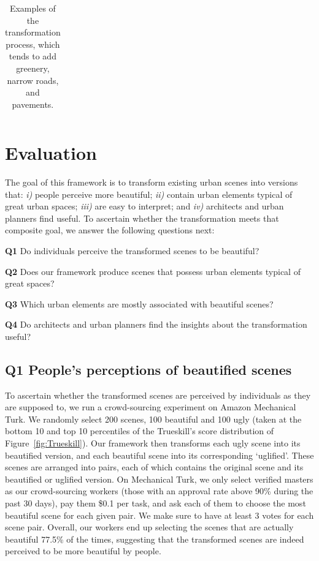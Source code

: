 \begin{table}
\begin{tabular}{l*3{C}@{}}
        \bottomrule 
    \end{tabular}
    \caption{Examples of the transformation process, which tends to add greenery, narrow roads, and  pavements.}
    \label{fig:BeautyExample}
\end{table} 




\section{Evaluation}
\label{sec:evaluation}

The goal of this framework is to transform existing urban scenes into versions that: \emph{i)} people perceive more beautiful; \emph{ii)} contain urban elements typical of great urban spaces; \emph{iii)} are easy to interpret; and \emph{iv)} architects and urban planners find useful. To ascertain whether the transformation meets that composite goal, we answer the following questions next: 

\begin{description}
    \item{\textbf{Q1}} Do individuals perceive the transformed scenes to be beautiful?
    \item{\textbf{Q2}}  Does our framework produce scenes that possess urban elements typical of great spaces?  
    \item{\textbf{Q3}}  Which urban elements are mostly associated with beautiful scenes?    
    \item{\textbf{Q4}}  Do architects and urban planners find the insights about the transformation useful?    
\end{description}


\subsection{Q1 People's perceptions of beautified scenes}
To ascertain whether the transformed scenes are perceived by individuals as they are supposed to, we run a crowd-sourcing experiment on Amazon Mechanical Turk.  We randomly select 200 scenes, 100 beautiful and 100 ugly  (taken at the bottom 10 and top 10 percentiles of the Trueskill's score distribution of Figure~\ref{fig:Trueskill}). Our framework then transforms each ugly scene into its beautified version, and each beautiful scene into its corresponding `uglified'. These scenes are arranged into pairs, each of which contains the original scene and its beautified or uglified version. On  Mechanical Turk, we only select verified masters as our crowd-sourcing workers (those with an approval rate above 90\% during the past 30 days), pay them \$0.1 per  task,  and ask each of them to choose the most beautiful scene for each given pair.  We make sure to have at least 3 votes for each scene pair. Overall, our workers end up selecting the scenes that are actually beautiful 77.5\% of the times, suggesting that the transformed scenes are indeed perceived to be more beautiful by people. 

